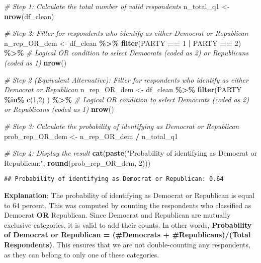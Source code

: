 \documentclass[
  11pt,
]{article}
\newenvironment{Shaded}{\begin{snugshade}}{\end{snugshade}}
\newcommand{\CommentTok}[1]{\textcolor[rgb]{0.56,0.35,0.01}{\textit{#1}}}
\newcommand{\DecValTok}[1]{\textcolor[rgb]{0.00,0.00,0.81}{#1}}
\newcommand{\FunctionTok}[1]{\textcolor[rgb]{0.13,0.29,0.53}{\textbf{#1}}}
\newcommand{\NormalTok}[1]{#1}
\newcommand{\OtherTok}[1]{\textcolor[rgb]{0.56,0.35,0.01}{#1}}
\newcommand{\SpecialCharTok}[1]{\textcolor[rgb]{0.81,0.36,0.00}{\textbf{#1}}}
\newcommand{\StringTok}[1]{\textcolor[rgb]{0.31,0.60,0.02}{#1}}
\begin{document}
\begin{Shaded}
\begin{Highlighting}[]
\CommentTok{\# Step 1: Calculate the total number of valid respondents}
\NormalTok{n\_total\_q1 }\OtherTok{\textless{}{-}} \FunctionTok{nrow}\NormalTok{(df\_clean)}

\CommentTok{\# Step 2: Filter for respondents who identify as either Democrat or Republican}
\NormalTok{n\_rep\_OR\_dem }\OtherTok{\textless{}{-}}\NormalTok{ df\_clean }\SpecialCharTok{\%\textgreater{}\%}
  \FunctionTok{filter}\NormalTok{(PARTY }\SpecialCharTok{==} \DecValTok{1} \SpecialCharTok{|}\NormalTok{ PARTY }\SpecialCharTok{==} \DecValTok{2}\NormalTok{) }\SpecialCharTok{\%\textgreater{}\%}  \CommentTok{\# Logical OR condition to select Democrats (coded as 2) or Republicans (coded as 1)}
  \FunctionTok{nrow}\NormalTok{()}

\CommentTok{\# Step 2 (Equivalent Alternative): Filter for respondents who identify as either Democrat or Republican}
\NormalTok{n\_rep\_OR\_dem }\OtherTok{\textless{}{-}}\NormalTok{ df\_clean }\SpecialCharTok{\%\textgreater{}\%}
  \FunctionTok{filter}\NormalTok{(PARTY }\SpecialCharTok{\%in\%} \FunctionTok{c}\NormalTok{(}\DecValTok{1}\NormalTok{,}\DecValTok{2}\NormalTok{) ) }\SpecialCharTok{\%\textgreater{}\%}  \CommentTok{\# Logical OR condition to select Democrats (coded as 2) or Republicans (coded as 1)}
  \FunctionTok{nrow}\NormalTok{()}

\CommentTok{\# Step 3: Calculate the probability of identifying as Democrat or Republican}
\NormalTok{prob\_rep\_OR\_dem }\OtherTok{\textless{}{-}}\NormalTok{ n\_rep\_OR\_dem }\SpecialCharTok{/}\NormalTok{ n\_total\_q1}

\CommentTok{\# Step 4: Display the result}
\FunctionTok{cat}\NormalTok{(}\FunctionTok{paste}\NormalTok{(}\StringTok{"Probability of identifying as Democrat or Republican:"}\NormalTok{, }
            \FunctionTok{round}\NormalTok{(prob\_rep\_OR\_dem, }\DecValTok{2}\NormalTok{)))}
\end{Highlighting}
\end{Shaded}

\begin{verbatim}
## Probability of identifying as Democrat or Republican: 0.64
\end{verbatim}

\textbf{Explanation}: The probability of identifying as Democrat or
Republican is equal to 64 percent. This was computed by counting the
respondents who classified as Democrat \textbf{OR} Republican. Since
Democrat and Republican are mutually exclusive categories, it is valid
to add their counts. In other words, \textbf{Probability of Democrat or
Republican = (\#Democrats + \#Republicans)/(Total Respondents)}. This
ensures that we are not double-counting any respondents, as they can
belong to only one of these categories.
\end{document}
